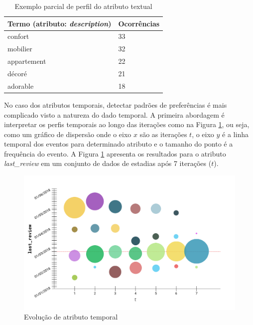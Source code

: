 \begin{table}[!h]
	\caption{Exemplo parcial de perfil do atributo textual}
	\label{table:perfil-textual-2}
	\centering
	\begin{tabular}{ll}
	\hline
	\textbf{Termo (atributo: {\em description})}     & \textbf{Ocorrências}     \\ \hline
	confort             & 33                       \\ 
	mobilier            & 32                       \\ 
	appartement             & 22                       \\ 
	décoré               & 21                       \\ 
	adorable               & 18                       \\ \hline
	\end{tabular}
	\mfonte
\end{table}

No caso dos atributos temporais, detectar padrões de preferências é mais complicado visto a natureza do dado temporal. A primeira abordagem é interpretar os perfis temporais ao longo das iterações como na Figura \ref{fig:analise-atributo-temporal}, ou seja, como um gráfico de dispersão onde o eixo $x$ são as iterações $t$, o eixo $y$ é a linha temporal dos eventos para determinado atributo e o tamanho do ponto é a frequência do evento. A Figura \ref{fig:analise-atributo-temporal} apresenta os resultados para o atributo {\em last\_review} em um conjunto de dados de estadias após 7 iterações ($t$).

\begin{figure}[!h]
	\caption{Evolução de atributo temporal}
	\label{fig:analise-atributo-temporal}
	\centering
	\includegraphics[width=\textwidth]{imagens/analise-atributo-temporal}
	\mfonte
\end{figure}


